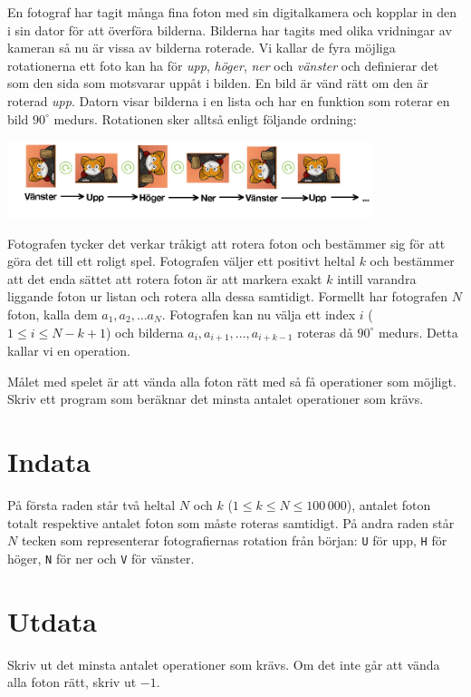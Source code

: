 En fotograf har tagit många fina foton med sin digitalkamera och kopplar in den
i sin dator för att överföra bilderna. Bilderna har tagits med olika vridningar
av kameran så nu är vissa av bilderna roterade. Vi kallar de fyra möjliga
rotationerna ett foto kan ha för \emph{upp}, \emph{höger}, \emph{ner} och \emph{vänster} och
definierar det som den sida som motsvarar uppåt i bilden. En bild är vänd rätt
om den är roterad \emph{upp}. Datorn visar bilderna i en lista och har en funktion
som roterar en bild $90^\circ$ medurs. Rotationen sker alltså enligt följande ordning:

\includegraphics[width=0.8\textwidth]{fotografen.png}

Fotografen tycker det verkar tråkigt att rotera foton och bestämmer sig för att
göra det till ett roligt spel. Fotografen väljer ett positivt heltal $k$ och
bestämmer att det enda sättet att rotera foton är att markera exakt $k$ intill varandra liggande foton ur listan och rotera alla dessa samtidigt. Formellt har fotografen $N$ foton, kalla dem $a_1, a_2, \dots
a_N$. Fotografen kan nu välja ett index $i$ ($1 \leq i \leq N-k+1$)
och bilderna $a_i, a_{i+1}, ... , a_{i+k-1}$ roteras då $90^\circ$ medurs. Detta kallar vi en
operation.

Målet med spelet är att vända alla foton rätt med så få operationer som
möjligt. Skriv ett program som beräknar det minsta antalet operationer som krävs.

\section*{Indata}
På första raden står två heltal $N$ och $k$ ($1 \leq k \leq N \leq 100\,000$),
antalet foton totalt respektive antalet foton som måste roteras samtidigt.
På andra raden står $N$ tecken som representerar fotografiernas rotation från
början: \texttt{U} för upp, \texttt{H} för höger, \texttt{N} för ner och
\texttt{V} för vänster.

\section*{Utdata}
Skriv ut det minsta antalet operationer som krävs. Om det inte går att vända
alla foton rätt, skriv ut $-1$.

